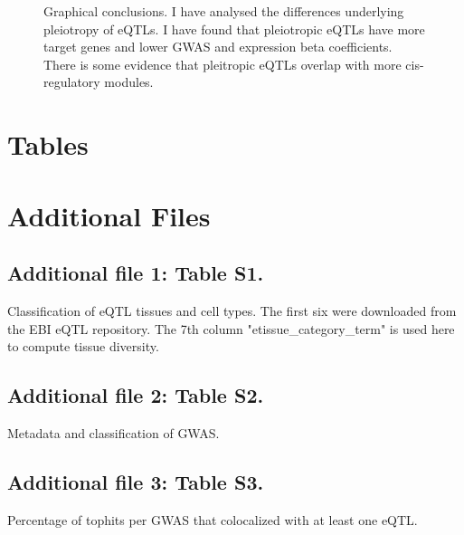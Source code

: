 \begin{backmatter}
%
%

\begin{figure}[!ht]
        \caption{
        Graphical conclusions. I have analysed the differences underlying pleiotropy of eQTLs.
        I have found that pleiotropic eQTLs have more target genes and lower GWAS and expression beta coefficients.
        There is some evidence that pleitropic eQTLs overlap with more cis-regulatory modules.
        }
    \label{fig:6}
\end{figure}


\section*{Tables}




\section*{Additional Files}
\subsection*{Additional file 1: Table S1.}
Classification of eQTL tissues and cell types. The first six were downloaded from the EBI eQTL repository.
The 7th column "etissue\_category\_term" is used here to compute tissue diversity.

\subsection*{Additional file 2: Table S2.}
Metadata and classification of GWAS.

\subsection*{Additional file 3: Table S3.}
Percentage of tophits per GWAS that colocalized with at least one eQTL.


\end{backmatter}
